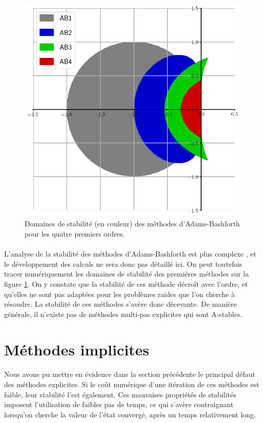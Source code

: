     \begin{figure}
      \centering
      \includegraphics[width=.6\textwidth]{images/ab_stab.png}
      \caption{Domaines de stabilité (en couleur) des méthodes d'Adams-Bashforth pour les quatre premiers ordres.}
      \label{fig:ab_stab}
    \end{figure}

    \paragraph{}
    L'analyse de la stabilité des méthodes d'Adams-Bashforth est plus complexe \cite{HairerNorsettWanner1993, HairerWanner1996}, et le développement des calculs ne sera donc pas détaillé ici.
    On peut toutefois tracer numériquement les domaines de stabilité des premières méthodes sur la figure \ref{fig:ab_stab}.
    On y constate que la stabilité de ces méthode décroît avec l'ordre, et qu'elles ne sont pas adaptées pour les problèmes raides que l'on cherche à résoudre.
    La stabilité de ces méthodes s'avère donc décevante.
    De manière générale, il n'existe pas de méthodes multi-pas explicites qui sont A-stables.


\section{Méthodes implicites}

  \paragraph{}
  Nous avons pu mettre en évidence dans la section précédente le principal défaut des méthodes explicites.
  Si le coût numérique d'une itération de ces méthodes est faible, leur stabilité l'est également.
  Ces mauvaises propriétés de stabilités imposent l'utilisation de faibles pas de temps, ce qui s'avère contraignant lorsqu'on cherche la valeur de l'état convergé, après un temps relativement long.


